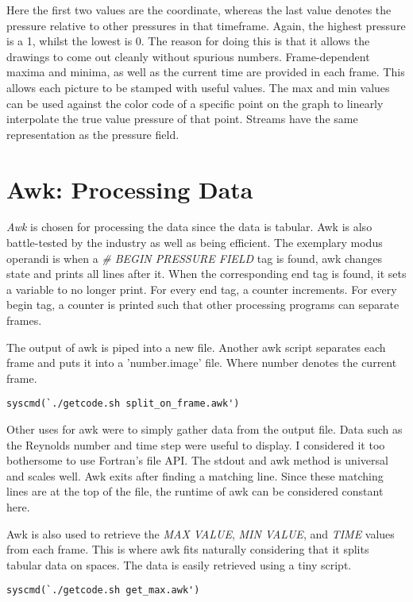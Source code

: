 \documentclass[listof=totoc]{report}
\begin{document}
Here the first two values are the coordinate, whereas the last value denotes the pressure relative to other pressures in that timeframe. Again, the highest pressure is a 1, whilst the lowest is 0. The reason for doing this is that it allows the drawings to come out cleanly without spurious numbers. Frame-dependent maxima and minima, as well as the current time are provided in each frame. This allows each picture to be stamped with useful values. The max and min values can be used against the color code of a specific point on the graph to linearly interpolate the true value pressure of that point. Streams have the same representation as the pressure field.

\section{Awk: Processing Data}
\emph{Awk} is chosen for processing the data since the data is tabular. Awk is also battle-tested by the industry as well as being efficient.
The exemplary modus operandi is when a \emph{\# BEGIN PRESSURE FIELD} tag is found, awk changes state and prints all lines after it. When the corresponding end tag is found, it sets a variable to no longer print. For every end tag, a counter increments. For every begin tag, a counter is printed such that other processing programs can separate frames.

The output of awk is piped into a new file. Another awk script separates each frame and puts it into a 'number.image' file. Where number denotes the current frame.

\begin{verbatim}
syscmd(`./getcode.sh split_on_frame.awk')
\end{verbatim}

Other uses for awk were to simply gather data from the output file. Data such as the Reynolds number and time step were useful to display. I considered it too bothersome to use Fortran's file API. The stdout and awk method is universal and scales well. Awk exits after finding a matching line. Since these matching lines are at the top of the file, the runtime of awk can be considered constant here.

Awk is also used to retrieve the \emph{MAX VALUE}, \emph{MIN VALUE}, and \emph{TIME} values from each frame. This is where awk fits naturally considering that it splits tabular data on spaces. The data is easily retrieved using a tiny script.

\begin{verbatim}
syscmd(`./getcode.sh get_max.awk')
\end{verbatim}
\end{document}
